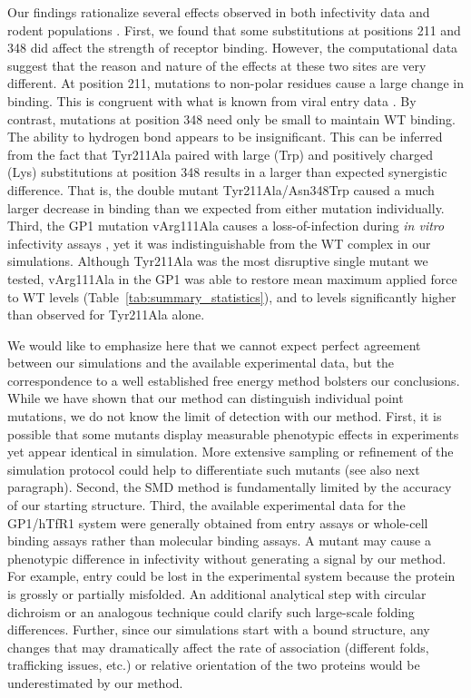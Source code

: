 \documentclass[12pt]{article}
\begin{document}
Our findings rationalize several effects observed in both infectivity data and rodent populations \citep{Rad2008,Rad20111}. First, we found that some substitutions at positions 211 and 348 did affect the strength of receptor binding. However, the computational data suggest that the reason and nature of the effects at these two sites are very different. At position 211, mutations to non-polar residues cause a large change in binding. This is congruent with what is known from viral entry data \citep{Rad2008,Rad20111}. By contrast, mutations at position 348 need only be small to maintain WT binding. The ability to hydrogen bond appears to be insignificant. This can be inferred from the fact that Tyr211Ala paired with large (Trp) and positively charged (Lys) substitutions at position 348 results in a larger than expected synergistic difference. That is, the double mutant Tyr211Ala/Asn348Trp caused a much larger decrease in binding than we expected from either mutation individually. Third, the GP1 mutation vArg111Ala causes a loss-of-infection during \textit{in vitro} infectivity assays \citep{Rad20112}, yet it was indistinguishable from the WT complex in our simulations. Although Tyr211Ala was the most disruptive single mutant we tested, vArg111Ala in the GP1 was able to restore mean maximum applied force to WT levels (Table~\ref{tab:summary_statistics}), and to levels significantly higher than observed for Tyr211Ala alone.

We would like to emphasize here that we cannot expect perfect agreement between our simulations and the available experimental data, but the correspondence to a well established free energy method bolsters our conclusions. While we have shown that our method can distinguish individual point mutations, we do not know the limit of detection with our method. First, it is possible that some mutants display measurable phenotypic effects in experiments yet appear identical in simulation. More extensive sampling or refinement of the simulation protocol could help to differentiate such mutants (see also next paragraph). Second, the SMD method is fundamentally limited by the accuracy of our starting structure. Third, the available experimental data for the GP1/hTfR1 system were generally obtained from entry assays or whole-cell binding assays rather than molecular binding assays. A mutant may cause a phenotypic difference in infectivity without generating a signal by our method. For example, entry could be lost in the experimental system because the protein is grossly or partially misfolded. An additional analytical step with circular dichroism or an analogous technique could clarify such large-scale folding differences. Further, since our simulations start with a bound structure, any changes that may dramatically affect the rate of association (different folds, trafficking issues, etc.) or relative orientation of the two proteins would be underestimated by our method. 
\end{document}
